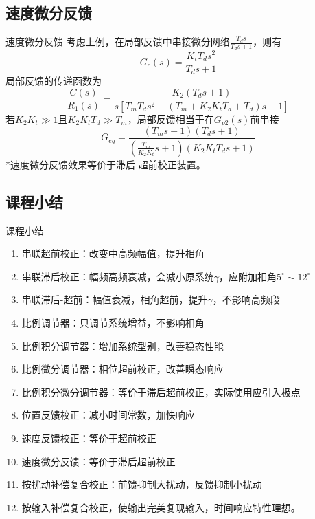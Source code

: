 \documentclass[handout,cjkutf8,table,aspectratio=1610]{beamer} %
\begin{document}
\subsection{速度微分反馈}
\begin{frame}{速度微分反馈}
	考虑上例，在局部反馈中串接微分网络$\frac{T_d s}{T_d s+1}$，则有
	$$G_c(s) = \frac{K_tT_ds^2}{T_ds+1}$$
	局部反馈的传递函数为
	$$\frac{C(s)}{R_1(s)} = \frac{K_2(T_ds+1)}{s[T_mT_ds^2+(T_m+K_2K_tT_d+T_d)s+1]}$$
	若$K_2K_t\gg 1$且$K_2K_tT_d\gg T_m$，局部反馈相当于在$G_{p2}(s)$前串接
	$$G_{eq} = \frac{(T_ms+1)(T_ds+1)}{\left(\frac{T_m}{K_2K_t}s+1\right)(K_2K_tT_ds+1)}$$
	*速度微分反馈效果等价于滞后-超前校正装置。
\end{frame}

\subsection{课程小结}
\begin{frame}{课程小结}
	\begin{enumerate}[(1)]
		\item 串联超前校正：改变中高频幅值，提升相角
		\item 串联滞后校正：幅频高频衰减，会减小原系统$\gamma$，应附加相角$5^\circ\sim12^\circ$
		\item 串联滞后-超前：幅值衰减，相角超前，提升$\gamma$，不影响高频段
		\item 比例调节器：只调节系统增益，不影响相角
		\item 比例积分调节器：增加系统型别，改善稳态性能
		\item 比例微分调节器：相位超前校正，改善瞬态响应
		\item 比例积分微分调节器：等价于滞后超前校正，实际使用应引入极点
		\item 位置反馈校正：减小时间常数，加快响应
		\item 速度反馈校正：等价于超前校正
		\item 速度微分反馈：等价于滞后超前校正
		\item 按扰动补偿复合校正：前馈抑制大扰动，反馈抑制小扰动
		\item 按输入补偿复合校正，使输出完美复现输入，时间响应特性理想。
	\end{enumerate}
\end{frame}
\end{document}

